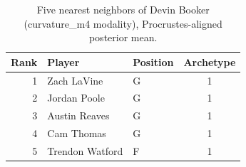 \begin{table}[htbp]
  \centering\small
  \begin{tabular}{rllc}
    \toprule
    Rank & Player & Position & Archetype \\
    \midrule
    1 & Zach LaVine & G & 1 \\
    2 & Jordan Poole & G & 1 \\
    3 & Austin Reaves & G & 1 \\
    4 & Cam Thomas & G & 1 \\
    5 & Trendon Watford & F & 1 \\
    \bottomrule
  \end{tabular}
  \caption{Five nearest neighbors of Devin Booker (curvature_m4 modality), Procrustes-aligned posterior mean.}
  \label{tab:Devin_Booker_neighbors_curvature_m4}
\end{table}

